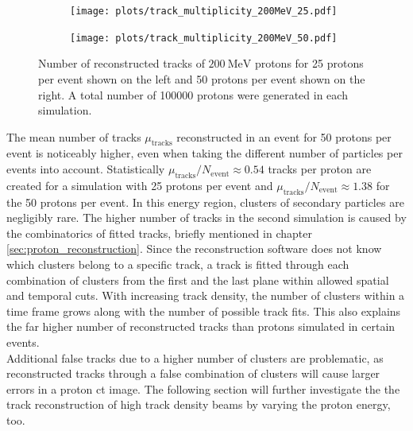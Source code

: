 \begin{figure}
  \hspace{-0.4cm}
  \begin{subfigure}{0.51\textwidth}
      \centering
      \texttt{[image: plots/track\_multiplicity\_200MeV\_25.pdf]}
  \end{subfigure}
  \begin{subfigure}{0.51\textwidth}
      \hspace{-0.13cm}
      \texttt{[image: plots/track\_multiplicity\_200MeV\_50.pdf]}
  \end{subfigure}
  \caption{Number of reconstructed tracks of $\SI{200}{\mega\eV}$ protons for 25 protons per event shown on the left and
  50 protons per event shown on the right. A total number of 100000 protons were generated in each simulation.}
  \label{fig:multiplicity}
\end{figure}

The mean number of tracks $\mu_{\text{tracks}}$ reconstructed in an event
for 50 protons per event is noticeably higher, even when taking the different number of particles per events into account. Statistically
$\mu_{\text{tracks}}/ N_{\text{event}} \approx 0.54$ tracks per proton are created for a simulation with 25 protons per event and
$\mu_{\text{tracks}}/ N_{\text{event}}\approx 1.38$ for
the 50 protons per event. In this energy region, clusters of secondary particles are negligibly rare. The higher number of tracks in the second simulation is caused by
the combinatorics of fitted tracks, briefly mentioned in chapter \ref{sec:proton_reconstruction}.
Since the reconstruction software does not know which clusters belong to a specific track, a track
is fitted through each combination of clusters from the first and the last plane within allowed spatial and temporal cuts.
With increasing track density, the number
of clusters within a time frame grows along with the number of possible track fits.
This also explains the far higher number of reconstructed tracks than protons simulated in certain events. \\
Additional false tracks due to a higher number of clusters are problematic, as reconstructed tracks through a false
combination of clusters will cause larger errors in a proton ct image. The following section will further investigate the the track reconstruction of high
track density beams by varying the proton energy, too.


